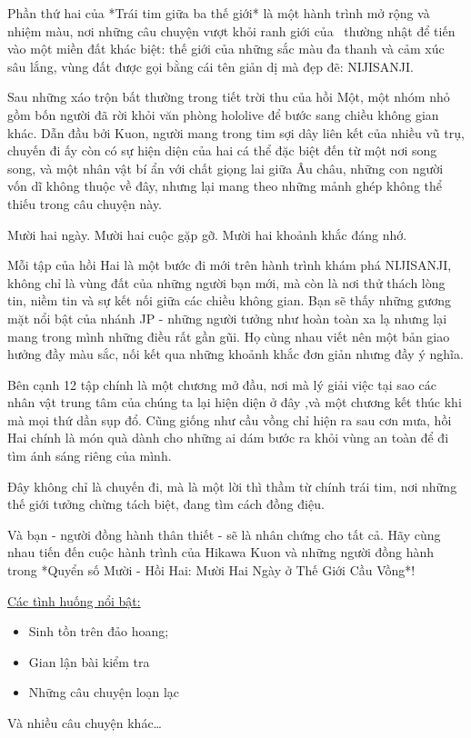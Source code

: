 \documentclass[main.tex]{subfiles}
\begin{document}
\color{black}
Phần thứ hai của *Trái tim giữa ba thế giới* là một hành trình mở rộng và nhiệm màu, nơi những câu chuyện vượt khỏi ranh giới của \hll\ thường nhật để tiến vào một miền đất khác biệt: thế giới của những sắc màu đa thanh và cảm xúc sâu lắng, vùng đất được gọi bằng cái tên giản dị mà đẹp đẽ: NIJISANJI.

Sau những xáo trộn bất thường trong tiết trời thu của hồi Một, một nhóm nhỏ gồm bốn người đã rời khỏi văn phòng hololive để bước sang chiều không gian khác. Dẫn đầu bởi Kuon, người mang trong tim sợi dây liên kết của nhiều vũ trụ, chuyến đi ấy còn có sự hiện diện của hai cá thể đặc biệt đến từ một nơi song song, và một nhân vật bí ẩn với chất giọng lai giữa Âu châu, những con người vốn dĩ không thuộc về đây, nhưng lại mang theo những mảnh ghép không thể thiếu trong câu chuyện này.

Mười hai ngày. Mười hai cuộc gặp gỡ. Mười hai khoảnh khắc đáng nhớ.

Mỗi tập của hồi Hai là một bước đi mới trên hành trình khám phá NIJISANJI, không chỉ là vùng đất của những người bạn mới, mà còn là nơi thử thách lòng tin, niềm tin và sự kết nối giữa các chiều không gian. Bạn sẽ thấy những gương mặt nổi bật của nhánh JP - những người tưởng như hoàn toàn xa lạ nhưng lại mang trong mình những điều rất gần gũi. Họ cùng nhau viết nên một bản giao hưởng đầy màu sắc, nối kết qua những khoảnh khắc đơn giản nhưng đầy ý nghĩa.

Bên cạnh 12 tập chính là một chương mở đầu, nơi mà lý giải việc tại sao các nhân vật trung tâm của chúng ta lại hiện diện ở đây ,và một chương kết thúc khi mà mọi thứ dần sụp đổ. Cũng giống như cầu vồng chỉ hiện ra sau cơn mưa, hồi Hai chính là món quà dành cho những ai dám bước ra khỏi vùng an toàn để đi tìm ánh sáng riêng của mình.

Đây không chỉ là chuyến đi, mà là một lời thì thầm từ chính trái tim, nơi những thế giới tưởng chừng tách biệt, đang tìm cách đồng điệu.

Và bạn - người đồng hành thân thiết - sẽ là nhân chứng cho tất cả. Hãy cùng nhau tiến đến cuộc hành trình của Hikawa Kuon và những người đồng hành trong *Quyển số Mười - Hồi Hai: Mười Hai Ngày ở Thế Giới Cầu Vồng*!

\underline{Các tình huống nổi bật:}
\begin{itemize}
    \item Sinh tồn trên đảo hoang;
    \item Gian lận bài kiểm tra    
    \item Những câu chuyện loạn lạc
\end{itemize}
Và nhiều câu chuyện khác\dots
\end{document}
